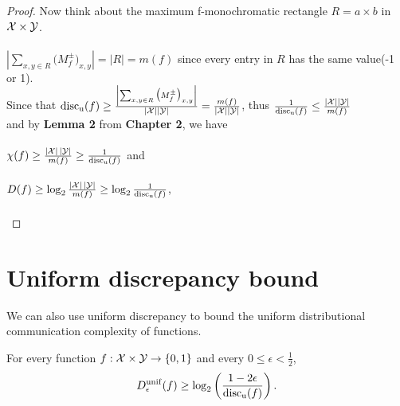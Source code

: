 \begin{proof}
	Now think about the maximum f-monochromatic rectangle $R = a \times b$ in $\mathcal{X} \times \mathcal{Y}$. \\
	\\
	$\left|\sum_{x,y \in R} \big(M^{\pm}_f\big)_{x,y}\right| = \left|R\right| = m(f)$ since every entry in $R$ has the same value(-1 or 1). \\
	Since that $\mathrm{disc_u}(f) \ge \frac{\left|\sum_{x,y \in R} \big(M^{\pm}_f\big)_{x,y}\right|}{|\mathcal{X}| |\mathcal{Y}|} = \frac{m(f)}{|\mathcal{X}| |\mathcal{Y}|}$, thus $\frac{1}{\mathrm{disc_u}(f)} \leq \frac{|\mathcal{X}||\mathcal{Y}|}{m(f)}$  \\
	and by \textbf{Lemma 2} from \textbf{Chapter 2}, we have \\
	\\
	$\chi(f) \ge \frac{|\mathcal{X}| \, |\mathcal{Y}|}{m(f)} \ge \frac{1}{\mathrm{disc_u}(f)}$ and \\
	\\
	$D(f) \ge \log_2 \frac{|\mathcal{X}| \, |\mathcal{Y}|}{m(f)} \ge \log_2 \frac{1}{\mathrm{disc_u}(f)}$, \\
	\\ 
\end{proof}


\section{Uniform discrepancy bound}

We can also use uniform discrepancy to bound the uniform distributional  communication complexity of functions.

\begin{lemma}
	For every function $f : \mathcal{X} \times \mathcal{Y} \to \{0,1\}$ and every $0 \le \epsilon < \frac12$, 
	\[
	D_\epsilon^{\mathrm{unif}}(f) \ge \log_2 \left( \frac{1-2\epsilon}{\mathrm{disc_u}(f)} \right).
	\]
\end{lemma}

